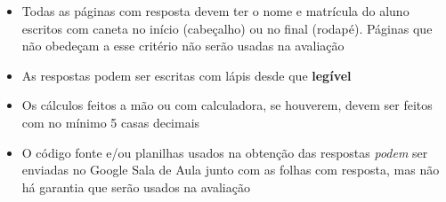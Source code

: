 \documentclass[12pt,a4paper,brazilian, fleqn]{article}
\begin{document}
\begin{tcolorbox}[colback=black!10, colframe=black!50, title=Observações]
    \begin{itemize}
        \item Todas as páginas com resposta devem ter o nome e matrícula do aluno
            escritos com caneta no início (cabeçalho) ou no final (rodapé). Páginas
            que não obedeçam a esse critério não serão usadas na avaliação
        \item As respostas podem ser escritas com lápis desde que \textbf{legível}
        \item Os cálculos feitos a mão ou com calculadora, se houverem, devem ser feitos com no mínimo 5 casas decimais
        \item O código fonte e/ou planilhas usados na obtenção das respostas \textit{podem} ser enviadas no Google Sala de Aula junto com as 
            folhas com resposta, mas não há garantia que serão usados na avaliação
    \end{itemize}
\end{tcolorbox}
\end{document}
